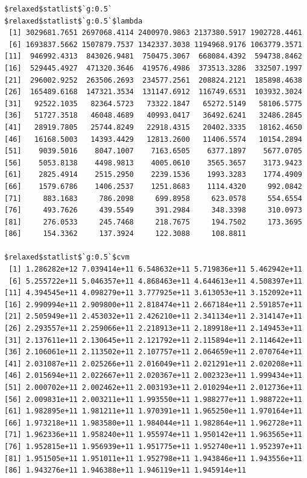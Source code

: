 \documentclass[
]{article}
\begin{document}
\begin{verbatim}
$relaxed$statlist$`g:0.5`
$relaxed$statlist$`g:0.5`$lambda
 [1] 3029681.7651 2697068.4114 2400970.9863 2137380.5917 1902728.4461
 [6] 1693837.5662 1507879.7537 1342337.3038 1194968.9176 1063779.3571
[11]  946992.4313  843026.9481  750475.3067  668084.4392  594738.8462
[16]  529445.4927  471320.3646  419576.4986  373513.3286  332507.1997
[21]  296002.9252  263506.2693  234577.2561  208824.2121  185898.4638
[26]  165489.6168  147321.3534  131147.6912  116749.6531  103932.3024
[31]   92522.1035   82364.5723   73322.1847   65272.5149   58106.5775
[36]   51727.3518   46048.4689   40993.0417   36492.6241   32486.2845
[41]   28919.7805   25744.8249   22918.4315   20402.3335   18162.4650
[46]   16168.5003   14393.4429   12813.2600   11406.5574   10154.2894
[51]    9039.5016    8047.1007    7163.6505    6377.1897    5677.0705
[56]    5053.8138    4498.9813    4005.0610    3565.3657    3173.9423
[61]    2825.4914    2515.2950    2239.1536    1993.3283    1774.4909
[66]    1579.6786    1406.2537    1251.8683    1114.4320     992.0842
[71]     883.1683     786.2098     699.8958     623.0578     554.6554
[76]     493.7626     439.5549     391.2984     348.3398     310.0973
[81]     276.0533     245.7468     218.7675     194.7502     173.3695
[86]     154.3362     137.3924     122.3088     108.8811

$relaxed$statlist$`g:0.5`$cvm
 [1] 1.286282e+12 7.039414e+11 6.548632e+11 5.719836e+11 5.462942e+11
 [6] 5.255722e+11 5.046357e+11 4.868463e+11 4.644613e+11 4.508397e+11
[11] 4.394545e+11 4.098279e+11 3.777925e+11 3.613053e+11 3.152092e+11
[16] 2.990994e+11 2.909800e+11 2.818474e+11 2.667184e+11 2.591857e+11
[21] 2.505949e+11 2.453032e+11 2.426210e+11 2.341134e+11 2.314147e+11
[26] 2.293557e+11 2.259066e+11 2.218913e+11 2.189918e+11 2.149453e+11
[31] 2.137611e+11 2.130645e+11 2.121792e+11 2.115894e+11 2.114642e+11
[36] 2.106061e+11 2.113502e+11 2.107757e+11 2.064659e+11 2.070764e+11
[41] 2.031087e+11 2.025266e+11 2.016049e+11 2.021291e+11 2.020208e+11
[46] 2.015694e+11 2.022667e+11 2.020367e+11 2.002323e+11 1.999434e+11
[51] 2.000702e+11 2.002462e+11 2.003193e+11 2.010294e+11 2.012736e+11
[56] 2.009831e+11 2.003211e+11 1.993550e+11 1.988277e+11 1.988722e+11
[61] 1.982895e+11 1.981211e+11 1.970391e+11 1.965250e+11 1.970164e+11
[66] 1.973218e+11 1.983580e+11 1.984044e+11 1.982864e+11 1.962728e+11
[71] 1.962336e+11 1.958240e+11 1.955974e+11 1.950142e+11 1.963565e+11
[76] 1.952815e+11 1.956939e+11 1.951775e+11 1.952740e+11 1.952397e+11
[81] 1.951505e+11 1.951011e+11 1.952798e+11 1.943846e+11 1.943556e+11
[86] 1.943276e+11 1.946388e+11 1.946119e+11 1.945914e+11


\end{verbatim}
\end{document}
